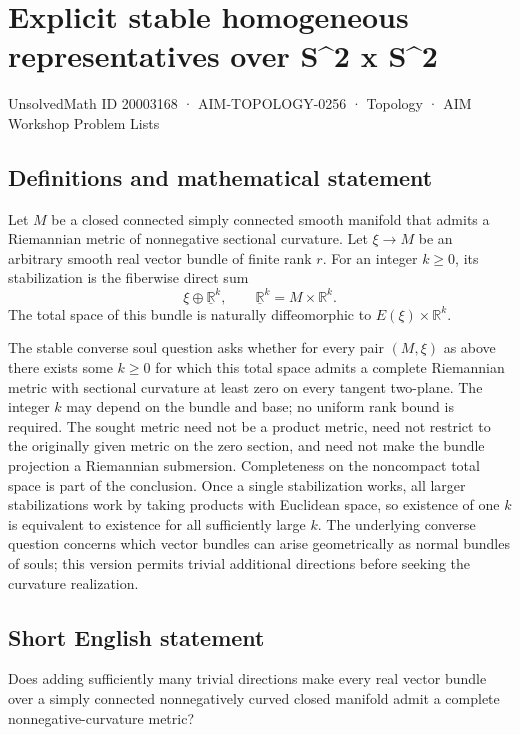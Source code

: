 \documentclass[11pt,a4paper]{article}
\begin{document}
\section*{Explicit stable homogeneous representatives over S\textasciicircum{}2 x S\textasciicircum{}2}\label{20003168}
{\small UnsolvedMath ID 20003168 · AIM-TOPOLOGY-0256 · Topology · AIM Workshop Problem Lists}
\subsection{Definitions and mathematical statement}
Let $M$ be a closed connected simply connected smooth manifold that admits a Riemannian metric of nonnegative sectional curvature.
Let $\xi\to M$ be an arbitrary smooth real vector bundle of finite rank $r$.
For an integer $k\geq0$, its stabilization is the fiberwise direct sum
\[
 \xi\oplus\underline{\mathbb R}^{k},
 \qquad \underline{\mathbb R}^{k}=M\times\mathbb R^k.
\]
The total space of this bundle is naturally diffeomorphic to $E(\xi)\times\mathbb R^k$.

The stable converse soul question asks whether for every pair $(M,\xi)$ as above there exists some $k\geq0$ for which this total space admits a complete Riemannian metric with sectional curvature at least zero on every tangent two-plane.
The integer $k$ may depend on the bundle and base; no uniform rank bound is required.
The sought metric need not be a product metric, need not restrict to the originally given metric on the zero section, and need not make the bundle projection a Riemannian submersion.
Completeness on the noncompact total space is part of the conclusion.
Once a single stabilization works, all larger stabilizations work by taking products with Euclidean space, so existence of one $k$ is equivalent to existence for all sufficiently large $k$.
The underlying converse question concerns which vector bundles can arise geometrically as normal bundles of souls; this version permits trivial additional directions before seeking the curvature realization.
\subsection{Short English statement}
Does adding sufficiently many trivial directions make every real vector bundle over a simply connected nonnegatively curved closed manifold admit a complete nonnegative-curvature metric?
\end{document}
